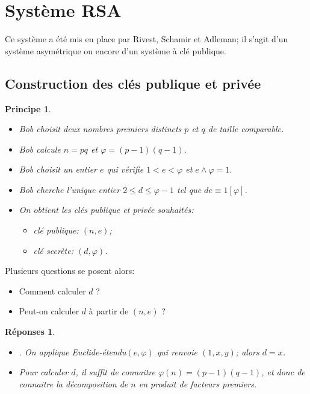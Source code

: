 \documentclass[12pt]{report}
\newtheorem*{reps}{Réponses}
\newtheorem*{prin}{Principe}
\begin{document}
\section{Système RSA}

Ce système a été mis en place par Rivest, Schamir et Adleman; il s'agit d'un système asymétrique ou encore d'un système à clé publique.


\subsection{Construction des clés publique et privée}



\begin{prin}\
\begin{itemize}
\item[•] Bob choisit deux nombres premiers distincts $p$ et $q$ de taille comparable.
\item[•] Bob calcule $n=pq$ et $\varphi=(p-1)(q-1)$.
\item[•] Bob choisit un entier $e$ qui vérifie $1<e< \varphi$ et $e \wedge \varphi=1$.
\item[•] Bob cherche l'unique entier $2 \leq d \leq \varphi -1$ tel que $de \equiv 1 [\varphi]$.
\item[•] On obtient les clés publique et privée souhaités:
\begin{itemize}
\item[$\star$] clé publique: $(n,e)$;
\item[$\star$] clé secrète: $(d,\varphi)$.
\end{itemize}  
\end{itemize}
\end{prin}

Plusieurs questions se posent alors:
\begin{itemize}
\item[$1)$] Comment calculer $d$ ?
\item[$2)$] Peut-on calculer $d$ à partir de $(n,e)$ ?
\end{itemize}

\begin{reps}
\begin{itemize}
\item[$1)$] . On applique Euclide-étendu$(e,\varphi)$ qui renvoie $(1,x,y)$; alors $d=x$.
\item[$2)$] Pour calculer $d$, il suffit de connaitre $\varphi(n)=(p-1)(q-1)$, et donc de connaitre la décomposition de $n$ en produit de facteurs premiers.
\end{itemize}
\end{reps}
\end{document}
